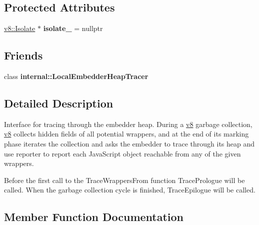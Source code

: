 \subsection*{Protected Attributes}
\begin{DoxyCompactItemize}
\item 
\mbox{\label{classv8_1_1EmbedderHeapTracer_a7a04822523cb72d457a40f84d964297b}} 
\mbox{\hyperlink{classv8_1_1Isolate}{v8\+::\+Isolate}} $\ast$ {\bfseries isolate\+\_\+} = nullptr
\end{DoxyCompactItemize}
\subsection*{Friends}
\begin{DoxyCompactItemize}
\item 
\mbox{\label{classv8_1_1EmbedderHeapTracer_a913fc415ac93e773a8e5d41f2f1878b6}} 
class {\bfseries internal\+::\+Local\+Embedder\+Heap\+Tracer}
\end{DoxyCompactItemize}


\subsection{Detailed Description}
Interface for tracing through the embedder heap. During a \mbox{\hyperlink{namespacev8}{v8}} garbage collection, \mbox{\hyperlink{namespacev8}{v8}} collects hidden fields of all potential wrappers, and at the end of its marking phase iterates the collection and asks the embedder to trace through its heap and use reporter to report each Java\+Script object reachable from any of the given wrappers.

Before the first call to the Trace\+Wrappers\+From function Trace\+Prologue will be called. When the garbage collection cycle is finished, Trace\+Epilogue will be called. 

\subsection{Member Function Documentation}
\mbox{\label{classv8_1_1EmbedderHeapTracer_a997b79af3a065c17868638bfc0c0a0ab}} 
